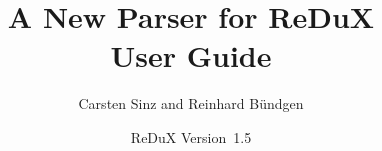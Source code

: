 \pagestyle{headings}





\title{A New Parser for ReDuX\\User Guide}
\author{Carsten Sinz and Reinhard B\"undgen}
\date{ReDuX Version~1.5}

\newtheorem{xmpl}{Example}[section]
\newtheorem{note}{Note}[section]




\maketitle
\pagebreak

\tableofcontents
\listoffigures
\listoftables
\newpage









